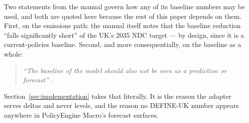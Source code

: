 Two statements from the manual govern how any of its baseline numbers may be used, and both are quoted here because the rest of this paper depends on them. First, on the emissions path: the manual itself notes that the baseline reduction ``falls significantly short'' of the UK's 2035 NDC target --- by design, since it is a current-policies baseline. Second, and more consequentially, on the baseline as a whole:

\begin{quote}
\emph{``The baseline of the model should also not be seen as a prediction or forecast''} \citep[\S4.1]{georgedafermos2026manual}.
\end{quote}

\noindent Section~\ref{sec:implementation} takes that literally. It is the reason the adapter serves deltas and never levels, and the reason no DEFINE-UK number appears anywhere in PolicyEngine Macro's forecast surfaces.
